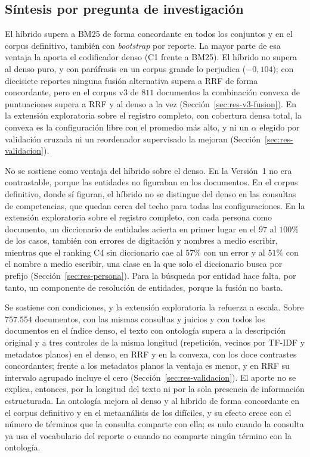 \documentclass[11pt,letterpaper]{article}
\numberwithin{equation}{section}
\begin{document}
\subsection{Síntesis por pregunta de investigación}
\label{sec:res-sintesis}
\begin{description}[leftmargin=2.6em,style=nextline,itemsep=2pt]
  \item[\textbf{P1.}] El híbrido supera a BM25 de forma concordante en todos los conjuntos y en el corpus definitivo, también con \textit{bootstrap} por reporte. La mayor parte de esa ventaja la aporta el codificador denso (C1 frente a BM25). El híbrido no supera al denso puro, y con paráfrasis en un corpus grande lo perjudica ($-0{,}104$); con diecisiete reportes ninguna fusión alternativa supera a RRF de forma concordante, pero en el corpus v3 de $811$ documentos la combinación convexa de puntuaciones supera a RRF y al denso a la vez (Sección~\ref{sec:res-v3-fusion}). En la extensión exploratoria sobre el registro completo, con cobertura densa total, la convexa es la configuración libre con el promedio más alto, y ni un $\alpha$ elegido por validación cruzada ni un reordenador supervisado la mejoran (Sección~\ref{sec:res-validacion}).
  \item[\textbf{P2.}] No se sostiene como ventaja del híbrido sobre el denso. En la Versión~1 no era contrastable, porque las entidades no figuraban en los documentos. En el corpus definitivo, donde sí figuran, el híbrido no se distingue del denso en las consultas de competencias, que quedan cerca del techo para todas las configuraciones. En la extensión exploratoria sobre el registro completo, con cada persona como documento, un diccionario de entidades acierta en primer lugar en el $97$ al $100\%$ de los casos, también con errores de digitación y nombres a medio escribir, mientras que el ranking C4 sin diccionario cae al $57\%$ con un error y al $51\%$ con el nombre a medio escribir, una clase en la que solo el diccionario busca por prefijo (Sección~\ref{sec:res-persona}). Para la búsqueda por entidad hace falta, por tanto, un componente de resolución de entidades, porque la fusión no basta.
  \item[\textbf{P3.}] Se sostiene con condiciones, y la extensión exploratoria la refuerza a escala. Sobre $757.554$ documentos, con las mismas consultas y juicios y con todos los documentos en el índice denso, el texto con ontología supera a la descripción original y a tres controles de la misma longitud (repetición, vecinos por TF-IDF y metadatos planos) en el denso, en RRF y en la convexa, con los doce contrastes concordantes; frente a los metadatos planos la ventaja es menor, y en RRF su intervalo agrupado incluye el cero (Sección~\ref{sec:res-validacion}). El aporte no se explica, entonces, por la longitud del texto ni por la sola presencia de información estructurada. La ontología mejora al denso y al híbrido de forma concordante en el corpus definitivo y en el metaanálisis de los difíciles, y su efecto crece con el número de términos que la consulta comparte con ella; es nulo cuando la consulta ya usa el vocabulario del reporte o cuando no comparte ningún término con la ontología.

\end{description}
\end{document}
